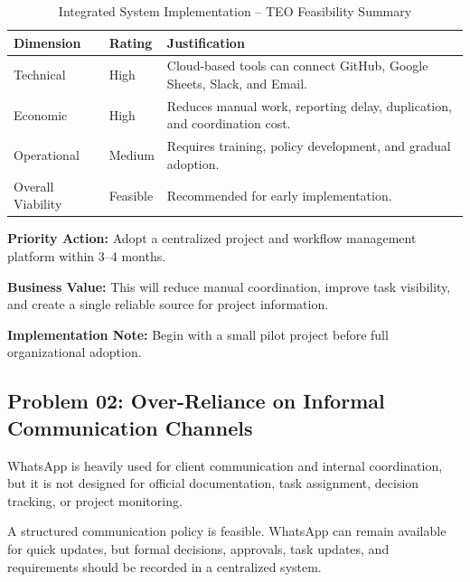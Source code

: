 \documentclass[12pt,a4paper]{report}
\begin{document}
\begin{table}[H]
\centering
\caption{Integrated System Implementation -- TEO Feasibility Summary}
\renewcommand{\arraystretch}{1.3}
\begin{tabularx}{\textwidth}{|p{3cm}|p{2.5cm}|X|}
\hline
\rowcolor{secondary}
\textbf{Dimension} & \textbf{Rating} & \textbf{Justification} \\
\hline
Technical & High & Cloud-based tools can connect GitHub, Google Sheets, Slack, and Email. \\
\hline
Economic & High & Reduces manual work, reporting delay, duplication, and coordination cost. \\
\hline
Operational & Medium & Requires training, policy development, and gradual adoption. \\
\hline
Overall Viability & Feasible & Recommended for early implementation. \\
\hline
\end{tabularx}
\end{table}

\begin{recommendBox}
\textbf{Priority Action:} Adopt a centralized project and workflow management platform within 3--4 months.

\textbf{Business Value:} This will reduce manual coordination, improve task visibility, and create a single reliable source for project information.

\textbf{Implementation Note:} Begin with a small pilot project before full organizational adoption.
\end{recommendBox}

\subsection{Problem 02: Over-Reliance on Informal Communication Channels}

\begin{problemBox}
WhatsApp is heavily used for client communication and internal coordination, but it is not designed for official documentation, task assignment, decision tracking, or project monitoring.
\end{problemBox}

\begin{summaryBox}
A structured communication policy is feasible. WhatsApp can remain available for quick updates, but formal decisions, approvals, task updates, and requirements should be recorded in a centralized system.
\end{summaryBox}
\end{document}
